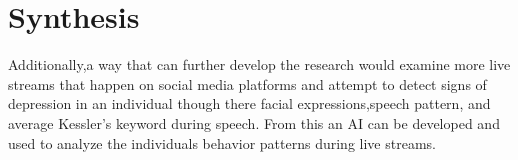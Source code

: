 \documentclass[twoside]{article}
\begin{document}
\section{Synthesis}
Additionally,a way that can further develop the research  would examine more live streams that happen on social media platforms and attempt to detect signs of depression in an individual  though there facial expressions,speech pattern, and average Kessler's keyword during speech. From this an AI can be developed and used to analyze the individuals behavior patterns during live streams. 



\end{document}

